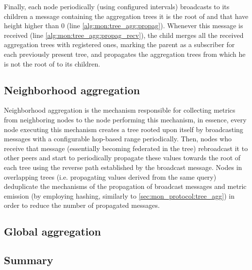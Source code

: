 Finally, each node periodically (using configured intervals) broadcasts to its children a message containing the aggregation trees it is the root of and that have height higher than 0 (line \ref{alg:mon:tree_agg:propag}). Whenever this message is received (line \ref{alg:mon:tree_agg:propag_recv}), the child merges all the received aggregation trees with registered ones, marking the parent as a subscriber for each previously present tree, and propagates the aggregation trees from which he is not the root of to its children.


\subsection{Neighborhood aggregation}

Neighborhood aggregation is the mechanism responsible for collecting metrics from neighboring nodes to the node performing this mechanism, in essence, every node executing this mechanism creates a tree rooted upon itself by broadcasting messages with a configurable hop-based range periodically. Then, nodes who receive that message (essentially becoming federated in the tree) rebroadcast it to other peers and start to periodically propagate these values towards the root of each tree using the reverse path established by the broadcast message. Nodes in overlapping trees (i.e. propagating values derived from the same query) deduplicate the mechanisms of the propagation of broadcast messages and metric emission (by employing hashing, similarly to \ref{sec:mon_protocol:tree_agg}) in order to reduce the number of propagated messages.



\subsection{Global aggregation}

\subsection{Summary}
